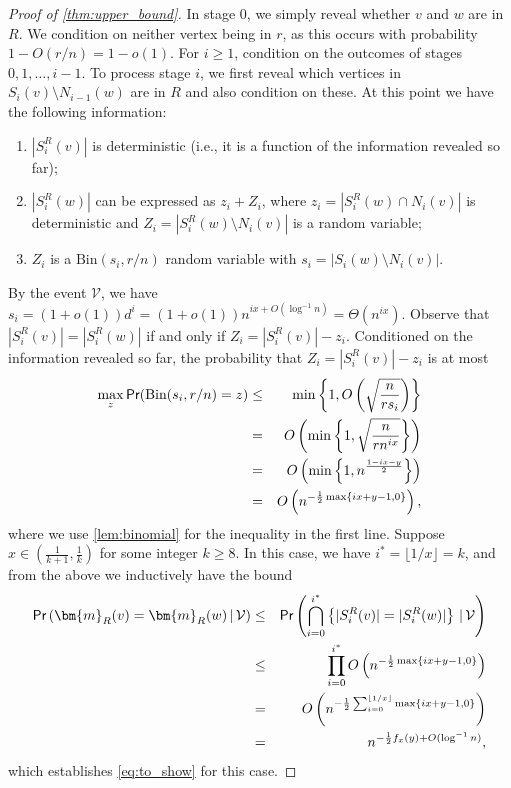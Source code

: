 \documentclass[12pt]{article}
\theoremstyle{definition}
\theoremstyle{remark}
\theoremstyle{remark}
\numberwithin{theorem}{section}
\newcommand{\prob}{\textsf{\upshape Pr}}
\begin{document}
\begin{proof}[Proof of \cref{thm:upper_bound}]
In stage $0$, we simply reveal whether $v$ and $w$ are in $R$. We condition on neither vertex being in $r$, as this occurs with probability $1 - O(r/n) = 1-o(1)$. For $i \geq 1$, condition on the outcomes of stages $0,1,\dots,i-1$. To process stage $i$, we first reveal which vertices in $S_{i}(v) \setminus N_{i-1}(w)$ are in $R$ and also condition on these. At this point we have the following information:
	\begin{enumerate}
		\item $|S_{i}^{R}(v)|$ is deterministic (i.e., it is a function of the information revealed so far);
		\item $|S_{i}^{R}(w)|$ can be expressed as $z_{i} + Z_{i}$, where $z_{i} = |S_{i}^{R}(w) \cap N_{i}(v)|$ is deterministic and $Z_{i} = |S_{i}^{R}(w) \setminus N_{i}(v)|$ is a random variable; 
		\item $Z_{i}$ is a $\text{Bin}(s_{i}, r/n)$ random variable with $s_{i} = |S_{i}(w) \setminus N_{i}(v)|$.
	\end{enumerate}
By the event $\mathcal{V}$, we have $s_{i} = (1+o(1))d^{i} = (1+o(1))n^{ix + O(\log^{-1}n)} = \Theta(n^{ix}).$ Observe that $|S_{i}^{R}(v)|=|S_{i}^{R}(w)|$ if and only if $Z_{i} = |S_{i}^{R}(v)| - z_{i}$. Conditioned on the information revealed so far, the probability that $Z_{i} = |S_{i}^{R}(v)| - z_{i}$ is at most
\begin{eqnarray*}
	\max_{z}\prob(\text{Bin}(s_{i}, r/n) = z) &\leq& \min\left\{1, O\left(\sqrt{\frac{n}{rs_{i}}}\right) \right\}\\
	&=&O\left(\min\left\{1, \sqrt{\frac{n}{rn^{ix}}}\right\}\right)\\
	&=&O\left(\min\left\{1, n^{\frac{1-ix-y}{2}} \right\} \right)\\
	&=&O\left(n^{-\frac{1}{2}\max\{ ix+y-1, 0 \} }\right),
\end{eqnarray*}
where we use \cref{lem:binomial} for the inequality in the first line. Suppose $x \in \left(\frac{1}{k+1}, \frac{1}{k} \right)$ for some integer $k \ge 8$. In this case, we have $i^{*} = \lfloor 1/x \rfloor = k$, and from the above we inductively have the bound
\begin{eqnarray*}
	\prob\left(\bm{m}_{R}(v) = \bm{m}_{R}(w)\,|\,\mathcal{V}\right) &\leq& \prob\left(\bigcap_{i=0}^{i^{*}}\left\{|S_{i}^{R}(v)| = |S_{i}^{R}(w)|\right\}\,|\,\mathcal{V}\right)\\
	&\leq& \prod_{i=0}^{i^{*}}O\left(n^{-\frac{1}{2}\max\{ ix+y-1, 0 \} }\right)\\
	&=&O\left(n^{-\frac{1}{2}\sum_{i=0}^{\lfloor 1/x \rfloor}\max\{ix+y-1,0\} }\right)\\
	&=&n^{-\frac{1}{2}f_{x}(y)+ O(\log^{-1}n)},
\end{eqnarray*}
which establishes \eqref{eq:to_show} for this case. 


\end{proof}
\end{document}
